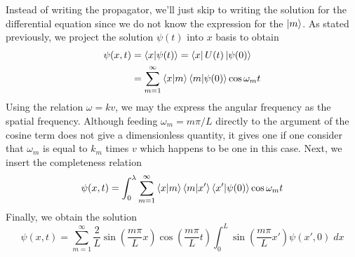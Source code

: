 \documentclass[../main.tex]{subfiles}
\begin{document}
Instead of writing the propagator, we'll just skip to writing the solution for the differential equation since we do not know the expression for the $\ket{m}$.
As stated previously, we project the solution $\psi(t)$ into $x$ basis to obtain 
\begin{align*}
	\psi(x,t)&=\braket{x|\psi(t)}=\bra{x}U(t)\ket{\psi(0)}\\
	&=\sum_{m=1 }^{\infty }\braket{x|m}\braket{m|\psi(0)}\cos \omega_m t
\end{align*}
Using the relation $\omega=kv$, we may the express the angular frequency as the spatial frequency.
Although feeding $\omega_m=m\pi/L$ directly to the argument of the cosine term does not give a dimensionless quantity, it gives one if one consider that $\omega_m$ is equal to $k_m$ times $v$ which happens to be one in this case.
Next, we insert the completeness relation
\begin{equation*}
	\psi(x,t)=\int_{0 }^{\lambda }\sum_{m=1 }^{\infty }\braket{x|m}\braket{m|x'}\braket{x'|\psi(0)}\cos \omega_m t
\end{equation*}
Finally, we obtain the solution 
\begin{equation*}
	\psi(x,t)=\sum_{m=1}^{\infty}\frac{2 }{L }\sin \left( \frac{m\pi }{L }x  \right) \cos \left( \frac{m\pi }{L }t \right) \int_{0 }^{L }\sin \left( \frac{m\pi }{L }x'  \right) \psi(x',0)\;dx
\end{equation*}
\end{document}
